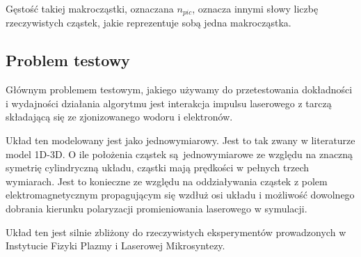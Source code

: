     Gęstość takiej makrocząstki, oznaczana $n_{pic}$, oznacza innymi słowy
    liczbę rzeczywistych cząstek, jakie reprezentuje sobą jedna makrocząstka.

    \subsection{Problem testowy}\label{seq:lasershield}

    Głównym problemem testowym, jakiego używamy do przetestowania dokładności i
    wydajności działania algorytmu jest interakcja impulsu laserowego z tarczą
    składającą się ze zjonizowanego wodoru i elektronów.

    Układ ten modelowany jest jako jednowymiarowy. Jest to tak zwany w
    literaturze model 1D-3D.  O ile położenia cząstek są jednowymiarowe ze
    względu na znaczną symetrię cylindryczną układu, cząstki mają prędkości w
    pełnych trzech wymiarach. Jest to konieczne ze względu na oddziaływania
    cząstek z polem elektromagnetycznym propagującym się wzdłuż osi układu
    i możliwość dowolnego dobrania kierunku polaryzacji promieniowania
    laserowego w symulacji.

    Układ ten jest silnie zbliżony do rzeczywistych eksperymentów prowadzonych
    w Instytucie Fizyki Plazmy i Laserowej Mikrosyntezy.  

